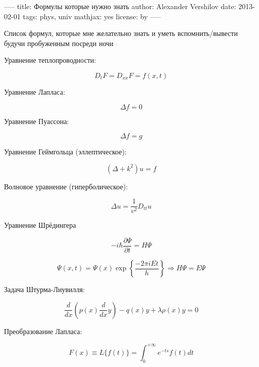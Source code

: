 -----
title: Формулы которые нужно знать
author: Alexander Vershilov
date: 2013-02-01
tags: phys, univ
mathjax: yes
license: by
-----


Список формул, которые мне желательно знать и уметь вспомнить/вывести будучи пробуженным посреди ночи

Уравнение теплопроводности:

$$ D_t F = D_{xx} F = f(x,t) $$

Уравнение Лапласа:

$$ \Delta f = 0 $$

Уравнение Пуассона:

$$ \Delta f = g $$

Уравнение Геймгольца (эллептическое):

$$ (\Delta + k^2) u = f $$

Волновое уравнение (гиперболическое):

$$ \Delta u = \frac{1}{v^2} D_{tt} u $$

Уравнение Шрёдингера

$$ -i \hbar \frac{\partial \Psi}{\partial t} = H \Psi $$

$$ \Psi(x,t) = \Psi(x) \exp\left\{ \frac{-2\pi i E t}{h}\right\} \Rightarrow H\Psi = E\Psi$$

Задача Штурма-Лиувилля:

$$ \frac{d}{dx} \left( p(x) \frac{d}{dx} y \right) - q(x)y+\lambda\rho(x)y=0 $$

Преобразование Лапласа:

$$ F(x) \equiv L\{f(t)\} = \int_0^{+\infty}e^{-ts}f(t)dt$$





